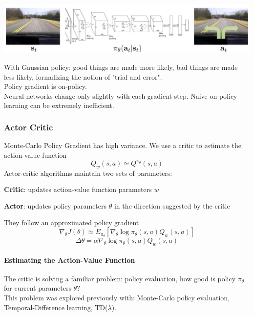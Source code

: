 \documentclass[10pt]{report}
\begin{document}
\begin{center}
	\includegraphics[scale=0.5]{183.png}
\end{center}
With Gaussian policy: good things are made more likely, bad things are made less likely, formalizing the notion of "trial and error".\\
Policy gradient is on-policy.\\
Neural networks change only slightly with each gradient step. Naive on-policy learning can be extremely inefficient.
\subsubsection{Actor Critic}
Monte-Carlo Policy Gradient has high variance. We use a critic to estimate the action-value function
$$Q_w(s,a)\simeq Q^{\pi_\theta}(s,a)$$
Actor-critic algorithms maintain two sets of parameters:
\begin{list}{}{}
	\item \textbf{Critic}: updates action-value function parameters $w$
	\item \textbf{Actor}: updates policy parameters $\theta$ in the direction suggested by the critic
\end{list}
They follow an approximated policy gradient
$$\nabla_\theta J(\theta) \simeq E_{\pi_\theta}[\nabla_\theta\log\pi_\theta(s,a)Q_w(s,a)]$$
$$\Delta\theta = \alpha\nabla_\theta\log\pi_\theta(s,a)Q_w(s,a)$$
\paragraph{Estimating the Action-Value Function} The critic is solving a familiar problem: policy evaluation, how good is policy $\pi_\theta$ for current parameters $\theta$?\\
This problem was explored previously with: Monte-Carlo policy evaluation, Temporal-Difference learning, TD($\lambda$).
\pagebreak
\end{document}
